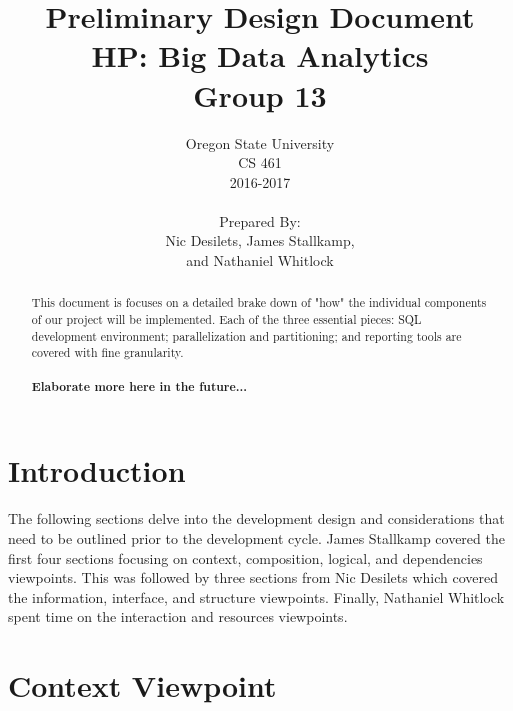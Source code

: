 \documentclass[draftclsnofoot, onecolumn, compsoc, 10pt]{IEEEtran}
\title{\Huge Preliminary Design Document\\\large HP: Big Data Analytics\\Group 13}
\author{Oregon State University\\CS 461\\2016-2017\\\\Prepared By:\\Nic Desilets, James Stallkamp,\\and Nathaniel Whitlock}
\begin{document}
\begin{titlingpage}
    \maketitle 
    
    \vspace{1in}
    \begin{abstract}
		\noindent This document is focuses on a detailed brake down of "how" the individual components of our project will be implemented.
        Each of the three essential pieces: SQL development environment; parallelization and partitioning; and reporting tools are covered with fine granularity.\\\\
        \textbf{Elaborate more here in the future...}
        
    \end{abstract}
\end{titlingpage}

{\small\tableofcontents} %
\pagebreak

\section{Introduction}
The following sections delve into the development design and considerations that need to be outlined prior to the development cycle.
James Stallkamp covered the first four sections focusing on context, composition, logical, and dependencies viewpoints.
This was followed by three sections from Nic Desilets which covered the information, interface, and structure viewpoints.
Finally, Nathaniel Whitlock spent time on the interaction and resources viewpoints.


\section{Context Viewpoint}
\end{document}
